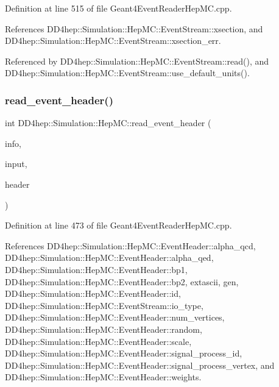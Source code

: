 Definition at line 515 of file Geant4\+Event\+Reader\+Hep\+M\+C.\+cpp.



References D\+D4hep\+::\+Simulation\+::\+Hep\+M\+C\+::\+Event\+Stream\+::xsection, and D\+D4hep\+::\+Simulation\+::\+Hep\+M\+C\+::\+Event\+Stream\+::xsection\+\_\+err.



Referenced by D\+D4hep\+::\+Simulation\+::\+Hep\+M\+C\+::\+Event\+Stream\+::read(), and D\+D4hep\+::\+Simulation\+::\+Hep\+M\+C\+::\+Event\+Stream\+::use\+\_\+default\+\_\+units().

\hypertarget{namespace_d_d4hep_1_1_simulation_1_1_hep_m_c_aff50680cc4089a0f2c3b7a0218b3ed2e}{}\label{namespace_d_d4hep_1_1_simulation_1_1_hep_m_c_aff50680cc4089a0f2c3b7a0218b3ed2e} 
\subsubsection{\texorpdfstring{read\+\_\+event\+\_\+header()}{read\_event\_header()}}
{\footnotesize\ttfamily int D\+D4hep\+::\+Simulation\+::\+Hep\+M\+C\+::read\+\_\+event\+\_\+header (\begin{DoxyParamCaption}\item[{\hyperlink{class_d_d4hep_1_1_simulation_1_1_hep_m_c_1_1_event_stream}{Event\+Stream} \&}]{info,  }\item[{istringstream \&}]{input,  }\item[{\hyperlink{class_d_d4hep_1_1_simulation_1_1_hep_m_c_1_1_event_header}{Event\+Header} \&}]{header }\end{DoxyParamCaption})}



Definition at line 473 of file Geant4\+Event\+Reader\+Hep\+M\+C.\+cpp.



References D\+D4hep\+::\+Simulation\+::\+Hep\+M\+C\+::\+Event\+Header\+::alpha\+\_\+qcd, D\+D4hep\+::\+Simulation\+::\+Hep\+M\+C\+::\+Event\+Header\+::alpha\+\_\+qed, D\+D4hep\+::\+Simulation\+::\+Hep\+M\+C\+::\+Event\+Header\+::bp1, D\+D4hep\+::\+Simulation\+::\+Hep\+M\+C\+::\+Event\+Header\+::bp2, extascii, gen, D\+D4hep\+::\+Simulation\+::\+Hep\+M\+C\+::\+Event\+Header\+::id, D\+D4hep\+::\+Simulation\+::\+Hep\+M\+C\+::\+Event\+Stream\+::io\+\_\+type, D\+D4hep\+::\+Simulation\+::\+Hep\+M\+C\+::\+Event\+Header\+::num\+\_\+vertices, D\+D4hep\+::\+Simulation\+::\+Hep\+M\+C\+::\+Event\+Header\+::random, D\+D4hep\+::\+Simulation\+::\+Hep\+M\+C\+::\+Event\+Header\+::scale, D\+D4hep\+::\+Simulation\+::\+Hep\+M\+C\+::\+Event\+Header\+::signal\+\_\+process\+\_\+id, D\+D4hep\+::\+Simulation\+::\+Hep\+M\+C\+::\+Event\+Header\+::signal\+\_\+process\+\_\+vertex, and D\+D4hep\+::\+Simulation\+::\+Hep\+M\+C\+::\+Event\+Header\+::weights.



